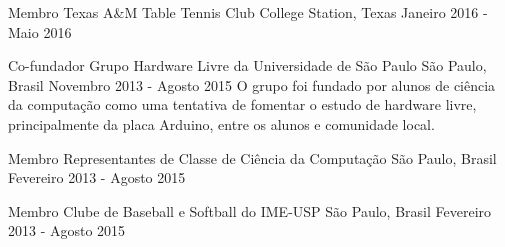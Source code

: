 \documentclass[11pt, a4paper]{awesome-cv-res}
\begin{document}
\begin{cventries}

\cventry
{Membro}
{Texas A\&M Table Tennis Club}
{College Station, Texas}
{Janeiro 2016 - Maio 2016}
{}

\cventry
{Co-fundador}
{Grupo Hardware Livre da Universidade de São Paulo}
{São Paulo, Brasil}
{Novembro 2013 - Agosto 2015}
{O grupo foi fundado por alunos de ciência da computação como uma tentativa de fomentar o estudo de hardware livre, principalmente da placa Arduino, entre os alunos e comunidade local.}
\newline
\newline

\cventry
{Membro}
{Representantes de Classe de Ciência da Computação}
{São Paulo, Brasil}
{Fevereiro 2013 - Agosto 2015}
{}

\cventry
{Membro}
{Clube de Baseball e Softball do IME-USP}
{São Paulo, Brasil}
{Fevereiro 2013 - Agosto 2015}
{}

\end{cventries}
\end{document}
